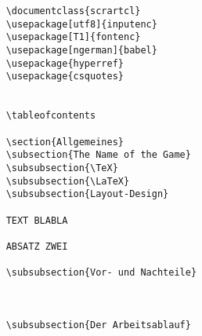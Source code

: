 \begin{verbatim}
	\documentclass{scrartcl}
	\usepackage[utf8]{inputenc}
	\usepackage[T1]{fontenc}
	\usepackage[ngerman]{babel}
	\usepackage{hyperref}
	\usepackage{csquotes}
	
	
	\tableofcontents
	
	\section{Allgemeines} 
	\subsection{The Name of the Game}
	\subsubsection{\TeX}
	\subsubsection{\LaTeX}
	\subsubsection{Layout-Design}
	
	TEXT BLABLA 
	
	ABSATZ ZWEI
	
	\subsubsection{Vor- und Nachteile}
	
	
	
	\subsubsection{Der Arbeitsablauf}
	
	
	
\end{verbatim}